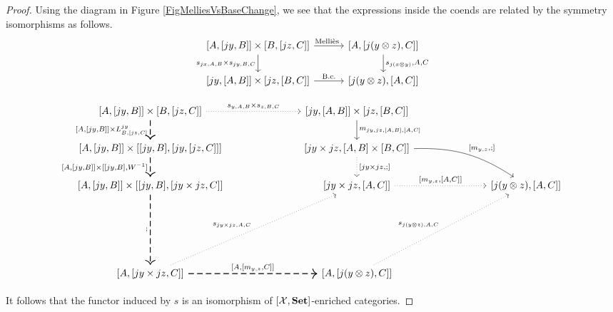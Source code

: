 \documentclass{article}
\begin{document}
\begin{proof}
  Using the diagram in Figure \ref{FigMelliesVsBaseChange}, we see that the expressions inside the coends are related by the symmetry isomorphisms as follows.
  \[
    \begin{tikzcd}[column sep=30pt]
      {[A,[jy,B]] \times [B,[jz,C]]} \arrow[r, "\text{\Mellies}" xshift=-2pt] \arrow[d, "{s_{jx,A,B}\times s_{jy,B,C}}"']
        & {[A,[j(y\tensor z),C]]} \arrow[d, "{s_{j(x\tensor y)},A,C}"] \\
      {[jy,[A,B]]\times [jz,[B,C]]} \arrow[r, "\text{B.c.}"]
        & {[j(y \tensor z),[A,C]]}
    \end{tikzcd}
    \]
  \begin{SidewaysFigure}
    \[
      \begin{tikzcd}[ampersand replacement=\&, column sep=73pt, row sep=20pt]
        {[A,[jy,B]] \times [B,[jz,C]]} \arrow[d, "{[A,[jy,B]] \times L_{B,[jz,C]}^{jy}}"', thick, dashed] \arrow[r, "{s_{y,A,B}\times s_{z,B,C}}", dotted]
          \& {[jy,[A,B]] \times [jz,[B,C]]} \arrow[d, "{m_{jy,jz,[A,B],[A,C]}}"]
            \& \\
        {[A,[jy,B]] \times [[jy,B],[jy,[jz,C]]]} \arrow[d, "{[A,[jy,B]]\times[[jy,B],W\inv]}"', thick, dashed]
          \& |[alias=Z]| {[jy \times jz,[A,B]\times[B,C]]} \arrow[d, "{[jy\times jz,;]}", dotted] \arrow[dr, "{[m_{y,z},;]}", bend left=17.5, from=Z.east]
            \& \\
        {[A,[jy,B]]} \times [[jy,B],[jy\times jz,C]] \arrow[d, ";"', thick, dashed]
          \& {[jy \times jz,[A,C]]} \arrow[r, "{[m_{y,z},[A,C]]}", dotted]
            \& {[j(y\tensor z),[A,C]]} \\[51pt]
        {[A,[jy \times jz,C]]} \arrow[ur, "{s_{jy\times jz,A,C}}", dotted] \arrow[r, "{[A,[m_{y,z},C]]}", thick, dashed]
          \& {[A,[j(y\tensor z),C]]} \arrow[ur, "{s_{j(y\tensor z),A,C}}", dotted]
            \&
      \end{tikzcd}
      \]
      \caption[Proof that \Mellies composition agrees with base-changed composition in the case of a symmetric reader action on $\Set$.]%
      {Proof that \Mellies composition agrees with base-changed composition in the case of a symmetric reader action on $\Set$.  
      The \Mellies composition is given by the thick dashed arrows, while the composition in the base-changed category is given by the thin arrows.
      The dotted lines at the top and at the bottom right -- given by the symmetry isomorphisms -- mediate between the two.
      We can verify that the main heptagon commutes by directly computing each direction: in each case, a pair $\langle f,g\rangle$ of functions is sent to the function $h \from A \to {[jy\times jz,C]}$ given by
      \[
        h(a)(Y,Z) = g(f(a)(Y))(Z)\,.
        \]}
      \label{FigMelliesVsBaseChange}
  \end{SidewaysFigure}
  It follows that the functor induced by $s$ is an isomorphism of $[\mathcal X,{\normalfont\textbf{Set}}]$-enriched categories.
\end{proof}
\end{document}
